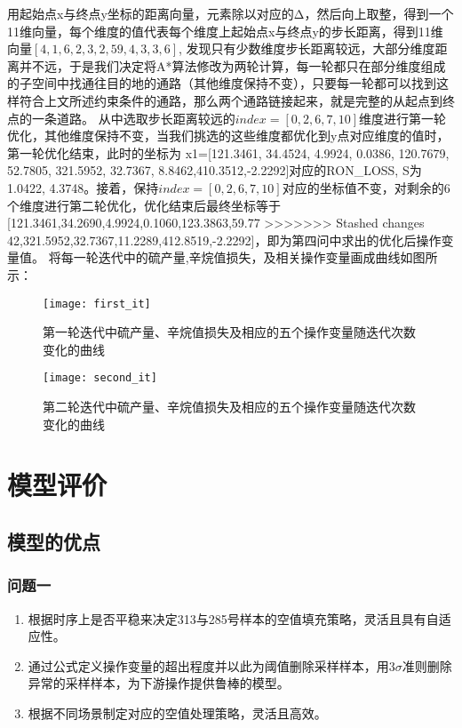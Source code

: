 \documentclass[bwprint]{gmcmthesis}
\begin{document}
用起始点x与终点y坐标的距离向量，元素除以对应的Δ，然后向上取整，得到一个11维向量，每个维度的值代表每个维度上起始点x与终点y的步长距离，得到11维向量\:$[4, 1, 6, 2, 3, 2, 59, 4, 3, 3, 6]$,
发现只有少数维度步长距离较远，大部分维度距离并不远，于是我们决定将A*算法修改为两轮计算，每一轮都只在部分维度组成的子空间中找通往目的地的通路（其他维度保持不变），只要每一轮都可以找到这样符合上文所述约束条件的通路，那么两个通路链接起来，就是完整的从起点到终点的一条道路。
从中选取步长距离较远的$index=[0,2,6,7,10]$维度进行第一轮优化，其他维度保持不变，当我们挑选的这些维度都优化到y点对应维度的值时，第一轮优化结束，此时的坐标为
x1=[121.3461, 34.4524, 4.9924, 0.0386, 120.7679, 52.7805, 321.5952, 32.7367, 8.8462,410.3512,-2.2292]对应的RON\_LOSS,  S为1.0422, 4.3748。接着，保持$index=[0,2,6,7,10]$对应的坐标值不变，对剩余的6个维度进行第二轮优化，优化结束后最终坐标等于[121.3461,34.2690,4.9924,0.1060,123.3863,59.77
>>>>>>> Stashed changes
42,321.5952,32.7367,11.2289,412.8519,-2.2292]，即为第四问中求出的优化后操作变量值。
将每一轮迭代中的硫产量,辛烷值损失，及相关操作变量画成曲线如图所示：
\begin{figure}[htb]
	\centering
	\texttt{[image: first\_it]}
	\caption{第一轮迭代中硫产量、辛烷值损失及相应的五个操作变量随迭代次数变化的曲线}
\end{figure}


\begin{figure}[htb]
	\centering
	\texttt{[image: second\_it]}
	\caption{第二轮迭代中硫产量、辛烷值损失及相应的五个操作变量随迭代次数变化的曲线}
\end{figure}


\FloatBarrier
\section{模型评价}


\FloatBarrier
\subsection{模型的优点}
\FloatBarrier
\subsubsection{问题一}
\begin{enumerate}[itemindent=20pt]
    \item 根据时序上是否平稳来决定313与285号样本的空值填充策略，灵活且具有自适应性。
    \item 通过公式定义操作变量的超出程度并以此为阈值删除采样样本，用3$\sigma$准则删除异常的采样样本，为下游操作提供鲁棒的模型。
    \item 根据不同场景制定对应的空值处理策略，灵活且高效。
\end{enumerate}
\end{document}

